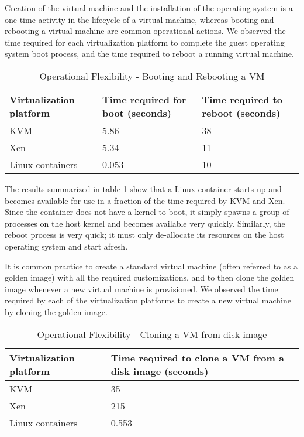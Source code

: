 Creation of the virtual machine and the installation of the operating system is a one-time activity in the lifecycle of a virtual machine, whereas booting and rebooting a virtual machine are common operational actions. We observed the time required for each virtualization platform to complete the guest operating system boot process, and the time required to reboot a running virtual machine.


\begin{table}[h!]
\begin{center}
\renewcommand{\arraystretch}{1.5}
\begin{tabular}{ | p{3.8cm} | p{5cm} | p{5.2cm} |}
  \hline                        
  Virtualization platform & Time required for boot (seconds) & Time required to reboot (seconds) \\ \hline
  KVM & 5.86 & 38 \\ \hline
  Xen & 5.34 & 11 \\ \hline
  Linux containers & 0.053 & 10 \\ 
  \hline  
\end{tabular}
\end{center}
\caption{Operational Flexibility - Booting and Rebooting a VM }
\label{table:boot}
\end{table}


The results summarized in table \ref{table:boot} show that a Linux container starts up and becomes available for use in a fraction of the time required by KVM and Xen. Since the container does not have a kernel to boot, it simply spawns a group of processes on the host kernel and becomes available very quickly. Similarly, the reboot process is very quick; it must only de-allocate its resources on the host operating system and start afresh. 


It is common practice to create a standard virtual machine (often referred to as a golden image) with all the required  customizations, and to then clone the golden image whenever a new virtual machine is provisioned. We observed the time required by each of the virtualization platforms to create a new virtual machine by cloning the golden image.

 
\begin{table}[h!]
\begin{center}
\renewcommand{\arraystretch}{1.5}
\begin{tabular}{ | p{4cm} | p{10cm} |}
  \hline                        
  Virtualization platform & Time required to clone a VM from a disk image (seconds) \\ \hline
  KVM & 35 \\ \hline
  Xen & 215 \\ \hline
  Linux containers & 0.553 \\ 
  \hline  
\end{tabular}
\end{center}
\caption{Operational Flexibility - Cloning a VM from disk image}
\label{table:cloning}
\end{table}


